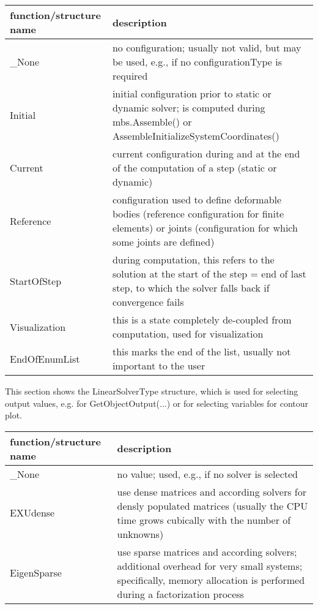 \begin{center}
\footnotesize
\begin{longtable}{| p{8cm} | p{8cm} |} 
\hline
{\bf function/structure name} & {\bf description}\\ \hline
  \_None & no configuration; usually not valid, but may be used, e.g., if no configurationType is required\\ \hline 
  Initial & initial configuration prior to static or dynamic solver; is computed during mbs.Assemble() or AssembleInitializeSystemCoordinates()\\ \hline 
  Current & current configuration during and at the end of the computation of a step (static or dynamic)\\ \hline 
  Reference & configuration used to define deformable bodies (reference configuration for finite elements) or joints (configuration for which some joints are defined)\\ \hline 
  StartOfStep & during computation, this refers to the solution at the start of the step = end of last step, to which the solver falls back if convergence fails\\ \hline 
  Visualization & this is a state completely de-coupled from computation, used for visualization\\ \hline 
  EndOfEnumList & this marks the end of the list, usually not important to the user\\ \hline 
\end{longtable}
\end{center}

This section shows the LinearSolverType structure, which is used for selecting output values, e.g. for GetObjectOutput(...) or for selecting variables for contour plot.



\begin{center}
\footnotesize
\begin{longtable}{| p{8cm} | p{8cm} |} 
\hline
{\bf function/structure name} & {\bf description}\\ \hline
  \_None & no value; used, e.g., if no solver is selected\\ \hline 
  EXUdense & use dense matrices and according solvers for densly populated matrices (usually the CPU time grows cubically with the number of unknowns)\\ \hline 
  EigenSparse & use sparse matrices and according solvers; additional overhead for very small systems; specifically, memory allocation is performed during a factorization process\\ \hline 
\end{longtable}
\end{center}
